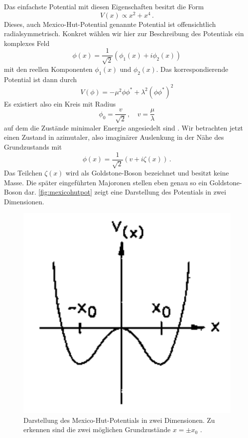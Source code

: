Das einfachste Potential mit diesen Eigenschaften besitzt die Form
\begin{equation*}
    V(x) \propto x^2 + x^4 \,.
\end{equation*}
Dieses, auch Mexico-Hut-Potential genannte Potential ist offensichtlich radialsymmetrisch.
Konkret wählen wir hier zur Beschreibung des Potentials ein komplexes Feld
\begin{equation*}
    \phi(x) = \frac{1}{\sqrt{2}} (\phi_1(x) + i \phi_2(x))
\end{equation*}
mit den reellen Komponenten $\phi_1(x)$ und $\phi_2(x)$.
Das korrespondierende Potential ist dann durch
\begin{equation}
    V(\phi) = -\mu^2 \phi\phi^* + \lambda^2 (\phi\phi^*)^2
\end{equation}
Es existiert also ein Kreis mit Radius
\begin{equation*}
    \phi_0 = \frac{v}{\sqrt{2}} \,, \quad v = \frac{\mu}{\lambda}
\end{equation*}
auf dem die Zustände minimaler Energie angesiedelt sind \cite{schmüser}.
Wir betrachten jetzt einen Zustand in azimutaler, also imaginärer Auslenkung in der Nähe des Grundzustands mit
\begin{equation*}
    \phi(x) = \frac{1}{\sqrt{2}} (v + i \zeta(x)) \,.
\end{equation*}
Das Teilchen $\zeta(x)$ wird als Goldstone-Boson bezeichnet und besitzt keine Masse.
Die später eingeführten Majoronen stellen eben genau so ein Goldstone-Boson dar.
\autoref{fig:mexicohutpot} zeigt eine Darstellung des Potentials in zwei Dimensionen.
\begin{figure}[H]
    \centering
    \includegraphics[]{figures/MexicoHutpotential.pdf}
    \caption{Darstellung des Mexico-Hut-Potentials in zwei Dimensionen. Zu erkennen sind die zwei möglichen Grundzustände $x = \pm x_0$ \cite{kleingrot}.}
    \label{fig:mexicohutpot}
\end{figure}
